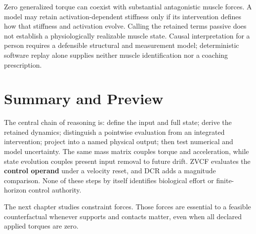 Zero generalized torque can coexist with substantial antagonistic muscle forces. A model may retain activation-dependent stiffness only if its intervention defines how that stiffness and activation evolve. Calling the retained terms passive does not establish a physiologically realizable muscle state. Causal interpretation for a person requires a defensible structural and measurement model; deterministic software replay alone supplies neither muscle identification nor a coaching prescription.

\section{Summary and Preview}
\label{sec:ztcf_summary}

The central chain of reasoning is: define the input and full state; derive the retained dynamics; distinguish a pointwise evaluation from an integrated intervention; project into a named physical output; then test numerical and model uncertainty. The same mass matrix couples torque and acceleration, while state evolution couples present input removal to future drift. ZVCF evaluates the \textbf{control operand} under a velocity reset, and DCR adds a magnitude comparison. None of these steps by itself identifies biological effort or finite-horizon control authority.

The next chapter studies constraint forces. Those forces are essential to a feasible counterfactual whenever supports and contacts matter, even when all declared applied torques are zero.

